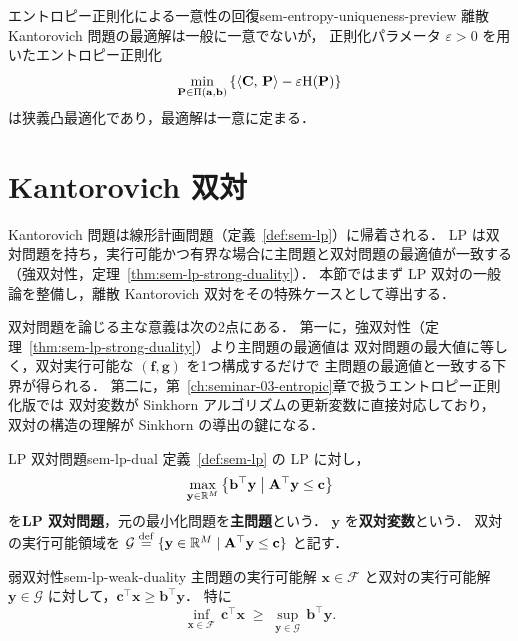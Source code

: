 \begin{remark}{エントロピー正則化による一意性の回復}{sem-entropy-uniqueness-preview}
  離散 Kantorovich 問題の最適解は一般に一意でないが，
  正則化パラメータ $\varepsilon > 0$ を用いたエントロピー正則化
  \[
    \min_{\mathbf{P} \in \Pi(\mathbf{a}, \mathbf{b})}
    \left\{
      \langle \mathbf{C},\, \mathbf{P} \rangle
      - \varepsilon \mathrm{H}(\mathbf{P})
    \right\}
  \]
  は狭義凸最適化であり，最適解は一意に定まる．
\end{remark}

\section{Kantorovich 双対}
\label{sec:sem-kantorovich-dual}

Kantorovich 問題は線形計画問題（定義~\ref{def:sem-lp}）に帰着される．
LP は双対問題を持ち，実行可能かつ有界な場合に主問題と双対問題の最適値が一致する
（強双対性，定理~\ref{thm:sem-lp-strong-duality}）．
本節ではまず LP 双対の一般論を整備し，離散 Kantorovich 双対をその特殊ケースとして導出する．

双対問題を論じる主な意義は次の2点にある．
第一に，強双対性（定理~\ref{thm:sem-lp-strong-duality}）より主問題の最適値は
双対問題の最大値に等しく，双対実行可能な $(\mathbf{f}, \mathbf{g})$ を1つ構成するだけで
主問題の最適値と一致する下界が得られる．
第二に，第~\ref{ch:seminar-03-entropic}章で扱うエントロピー正則化版では
双対変数が Sinkhorn アルゴリズムの更新変数に直接対応しており，
双対の構造の理解が Sinkhorn の導出の鍵になる．

\begin{definition}{LP 双対問題}{sem-lp-dual}
  定義~\ref{def:sem-lp} の LP に対し，
  \[
    \max_{\mathbf{y} \in \mathbb{R}^M}
    \left\{
      \mathbf{b}^\top \mathbf{y}
      \;\middle|\;
      \mathbf{A}^\top \mathbf{y} \leq \mathbf{c}
    \right\}
  \]
  を\textbf{LP 双対問題}，元の最小化問題を\textbf{主問題}という．
  $\mathbf{y}$ を\textbf{双対変数}という．
  双対の実行可能領域を
  $\mathcal{G} \overset{\mathrm{def}}{=} \{\mathbf{y} \in \mathbb{R}^M \mid \mathbf{A}^\top \mathbf{y} \leq \mathbf{c}\}$ と記す．
\end{definition}

\begin{claim}{弱双対性}{sem-lp-weak-duality}
  主問題の実行可能解 $\mathbf{x} \in \mathcal{F}$ と双対の実行可能解
  $\mathbf{y} \in \mathcal{G}$ に対して，$\mathbf{c}^\top \mathbf{x} \geq \mathbf{b}^\top \mathbf{y}$．
  特に
  \[
    \inf_{\mathbf{x} \in \mathcal{F}}\, \mathbf{c}^\top \mathbf{x}
    \;\geq\;
    \sup_{\mathbf{y} \in \mathcal{G}}\, \mathbf{b}^\top \mathbf{y}.
  \]
\end{claim}


